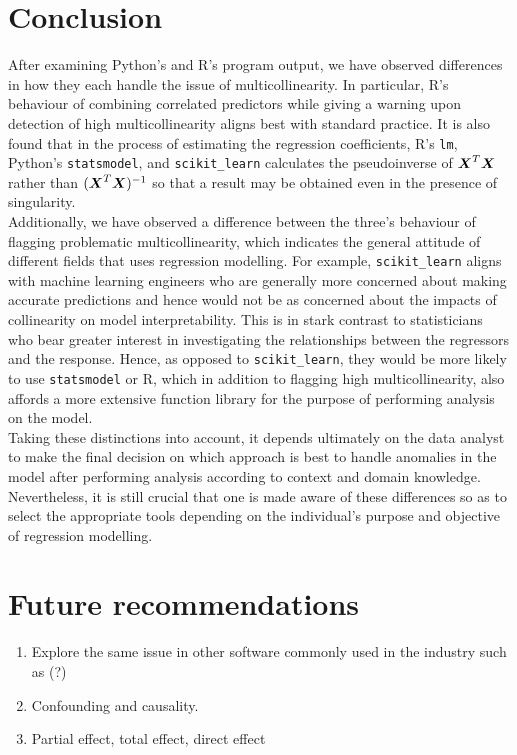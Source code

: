 \documentclass[12pt]{article}
\begin{document}
	\section{Conclusion}
	
	After examining Python's and R's program output, we have observed differences in how they each handle the issue of multicollinearity. In particular, R's behaviour of combining correlated predictors while giving a warning upon detection of high multicollinearity aligns best with standard practice. It is also found that in the process of estimating the regression coefficients, R's \texttt{lm}, Python's \texttt{statsmodel}, and \texttt{scikit\_learn} calculates the pseudoinverse of $\boldsymbol{X}^T\boldsymbol{X}$ rather than $(\boldsymbol{X}^T\boldsymbol{X})^{-1}$ so that a result may be obtained even in the presence of singularity.\\
	
	Additionally, we have observed a difference between the three's behaviour of flagging problematic multicollinearity, which indicates the general attitude of different fields that uses regression modelling. For example, \texttt{scikit\_learn} aligns with machine learning engineers who are generally more concerned about making accurate predictions and hence would not be as concerned about the impacts of collinearity on model interpretability. This is in stark contrast to statisticians who bear greater interest in investigating the relationships between the regressors and the response. Hence, as opposed to \texttt{scikit\_learn}, they would be more likely to use \texttt{statsmodel} or R, which in addition to flagging high multicollinearity, also affords a more extensive function library for the purpose of performing analysis on the model.\\
	
	Taking these distinctions into account, it depends ultimately on the data analyst to make the final decision on which approach is best to handle anomalies in the model after performing analysis according to context and domain knowledge. Nevertheless, it is still crucial that one is made aware of these differences so as to select the appropriate tools depending on the individual's purpose and objective of regression modelling. 
	
	\section{Future recommendations\label{sec:future-rec}}
	\begin{enumerate}
		\item Explore the same issue in other software commonly used in the industry such as (?)
		\item Confounding and causality.
		\item Partial effect, total effect, direct effect
	\end{enumerate}
	
\end{document}
